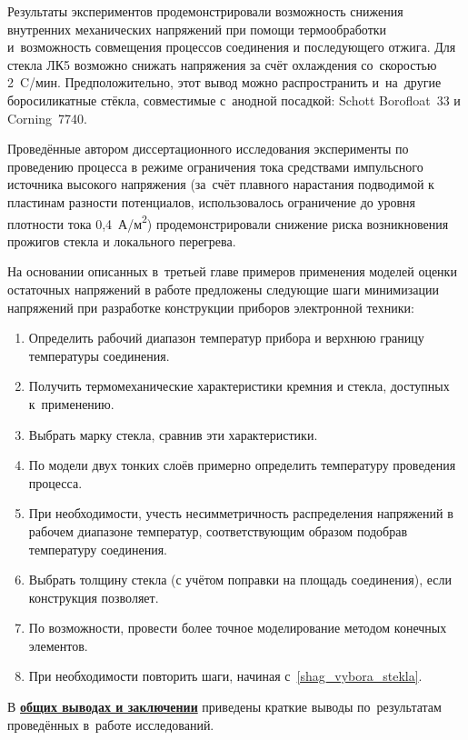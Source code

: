 Результаты экспериментов продемонстрировали возможность снижения внутренних
механических напряжений при помощи термообработки и~возможность совмещения
процессов соединения и последующего отжига. Для стекла ЛК5 возможно снижать
напряжения за счёт охлаждения со~скоростью 2~{\textdegree}C/мин.
Предположительно, этот вывод можно распространить и~на~другие боросиликатные
стёкла, совместимые с~анодной посадкой: Schott Borofloat~33 и Corning~7740.

Проведённые автором диссертационного исследования эксперименты
по проведению процесса в режиме ограничения
тока средствами импульсного источника высокого напряжения (за~счёт
плавного нарастания подводимой к пластинам разности потенциалов,
использовалось ограничение до уровня плотности тока
0,4~А/м{\textsuperscript{2}}) продемонстрировали снижение риска
возникновения прожигов стекла и локального перегрева.

На основании описанных в~третьей главе примеров применения моделей
оценки остаточных напряжений в работе предложены следующие шаги
минимизации напряжений при разработке конструкции приборов
электронной техники:

\begin{enumerate}
    \item Определить рабочий диапазон температур прибора
    и верхнюю границу температуры соединения.
    \item Получить термомеханические характеристики кремния и стекла,
    доступных к~применению.
    \item\label{shag_vybora_stekla} Выбрать марку стекла, сравнив эти
    характеристики.
    \item По модели двух тонких слоёв примерно определить температуру
    проведения процесса.
    \item При необходимости, учесть несимметричность распределения
    напряжений в рабочем диапазоне температур, соответствующим образом
    подобрав температуру соединения.
    \item Выбрать толщину стекла (с учётом поправки на площадь
    соединения), если конструкция позволяет.
    \item По возможности, провести более точное моделирование методом
    конечных элементов.
    \item При необходимости повторить шаги, начиная
    с~\ref{shag_vybora_stekla}.
\end{enumerate}

В \underline{\textbf{общих выводах и заключении}} приведены краткие выводы
по~результатам проведённых в~работе исследований.


